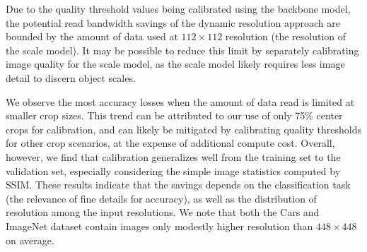 Due to the quality threshold values being calibrated using the backbone model, the potential read bandwidth savings of the dynamic resolution approach are bounded by the amount of data used at $112\times112$ resolution (the resolution of the scale model).
It may be possible to reduce this limit by separately calibrating image quality for the scale model, as the scale model likely requires less image detail to discern object scales.

We observe the most accuracy losses when the amount of data read is limited at smaller crop sizes.
This trend can be attributed to our use of only 75\% center crops for calibration, and can likely be mitigated by calibrating quality thresholds for other crop scenarios, at the expense of additional compute cost.
Overall, however, we find that calibration generalizes well from the training set to the validation set, especially considering the simple image statistics computed by SSIM.
These results indicate that the savings depends on the classification task (the relevance of fine details for accuracy), as well as the distribution of resolution among the input resolutions.
We note that both the Cars and ImageNet dataset contain images only modestly higher resolution than $448\times448$ on average.

